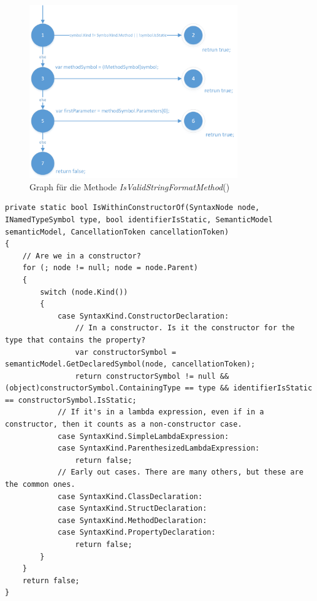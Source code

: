 \begin{figure}
	\centering
	\includegraphics[width=0.8\textwidth]{images/GraphISValidStringFormatMethod.png}
	\caption{Graph für die Methode \textit{IsValidStringFormatMethod}()}
	\label{fig:graph-validstring}
\end{figure}
\begin{lstlisting}
private static bool IsWithinConstructorOf(SyntaxNode node, INamedTypeSymbol type, bool identifierIsStatic, SemanticModel semanticModel, CancellationToken cancellationToken)
{
	// Are we in a constructor?
	for (; node != null; node = node.Parent)
	{
		switch (node.Kind())
		{
			case SyntaxKind.ConstructorDeclaration:
				// In a constructor. Is it the constructor for the type that contains the property?
				var constructorSymbol = semanticModel.GetDeclaredSymbol(node, cancellationToken);
				return constructorSymbol != null && (object)constructorSymbol.ContainingType == type && identifierIsStatic == constructorSymbol.IsStatic;
			// If it's in a lambda expression, even if in a constructor, then it counts as a non-constructor case.
			case SyntaxKind.SimpleLambdaExpression:
			case SyntaxKind.ParenthesizedLambdaExpression:
				return false;
			// Early out cases. There are many others, but these are the common ones.
			case SyntaxKind.ClassDeclaration:
			case SyntaxKind.StructDeclaration:
			case SyntaxKind.MethodDeclaration:
			case SyntaxKind.PropertyDeclaration:
				return false;
		}
	}
	return false;
}
\end{lstlisting}
